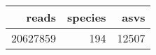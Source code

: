 \begin{longtable}{rrr}
  \hline
reads & species & asvs \\ 
  \hline
20627859 & 194 & 12507 \\ 
   \hline
\hline
\end{longtable}

